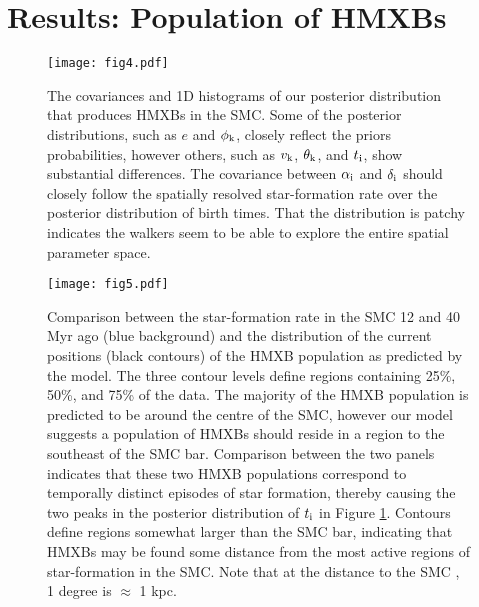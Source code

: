 \documentclass[usenatbib]{mnras}
\begin{document}
\section{Results: Population of HMXBs} \label{sec:results_population}


\begin{figure*}
\begin{center}
\texttt{[image: fig4.pdf]}
\caption{ The covariances and 1D histograms of our posterior distribution that produces HMXBs in the SMC. Some of the posterior distributions, such as $e$ and $\phi_{\rm k}$, closely reflect the priors probabilities, however others, such as $v_{\rm k}$, $\theta_{\rm k}$, and $t_{\rm i}$, show substantial differences. The covariance between $\alpha_{\rm i}$ and $\delta_{\rm i}$ should closely follow the spatially resolved star-formation rate over the posterior distribution of birth times. That the distribution is patchy indicates the walkers seem to be able to explore the entire spatial parameter space. }
\label{fig:population_corner}
\end{center}
\end{figure*}



\begin{figure}
\begin{center}
\texttt{[image: fig5.pdf]}
\caption{ Comparison between the star-formation rate in the SMC 12 and 40 Myr ago (blue background) and the distribution of the current positions (black contours) of the HMXB population as predicted by the model. The three contour levels define regions containing 25\%, 50\%, and 75\% of the data. The majority of the HMXB population is predicted to be around the centre of the SMC, however our model suggests a population of HMXBs should reside in a region to the southeast of the SMC bar. Comparison between the two panels indicates that these two HMXB populations correspond to temporally distinct episodes of star formation, thereby causing the two peaks in the posterior distribution of $t_{\rm i}$ in Figure \ref{fig:population_corner}. Contours define regions somewhat larger than the SMC bar, indicating that HMXBs may be found some distance from the most active regions of star-formation in the SMC. Note that at the distance to the SMC \citep[61 pc;][]{hilditch05}, 1 degree is $\approx$ 1 kpc.}
\label{fig:population_ra_dec}
\end{center}
\end{figure}
\end{document}
